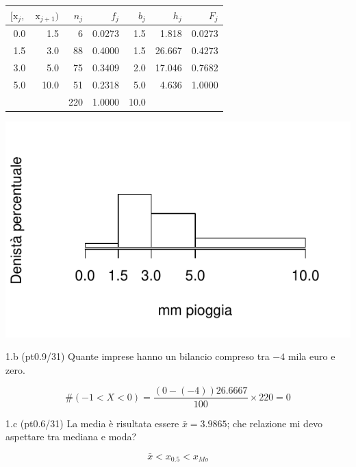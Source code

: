 \documentclass[
  10pt,
]{article}
\begin{document}
\begin{sol}

\begin{table}[H]
\centering
\begin{tabular}{rrrrrrr}
\toprule
$[\text{x}_j,$ & $\text{x}_{j+1})$ & $n_j$ & $f_j$ & $b_j$ & $h_j$ & $F_j$\\
\midrule
0.0 & 1.5 & 6 & 0.0273 & 1.5 & 1.818 & 0.0273\\
1.5 & 3.0 & 88 & 0.4000 & 1.5 & 26.667 & 0.4273\\
3.0 & 5.0 & 75 & 0.3409 & 2.0 & 17.046 & 0.7682\\
5.0 & 10.0 & 51 & 0.2318 & 5.0 & 4.636 & 1.0000\\
 &  & 220 & 1.0000 & 10.0 &  & \\
\bottomrule
\end{tabular}
\end{table}

\includegraphics{www/compito_files/figure-latex/2022-80-1.pdf}

\end{sol}

1.b (pt\hspace{.1em}0.9/31) Quante imprese hanno un bilancio compreso tra \(-4\) mila
euro e zero.

\begin{sol}
\[\#(-1<X<0)=\frac{(0-(-4))26.6667}{100}\times 220=0\]

\end{sol}

1.c (pt\hspace{.1em}0.6/31) La media è risultata essere \(\bar x=3.9865\); che
relazione mi devo aspettare tra mediana e moda?

\begin{sol}
\[\bar x<x_{0.5}<x_{Mo}\]

\end{sol}
\end{document}
